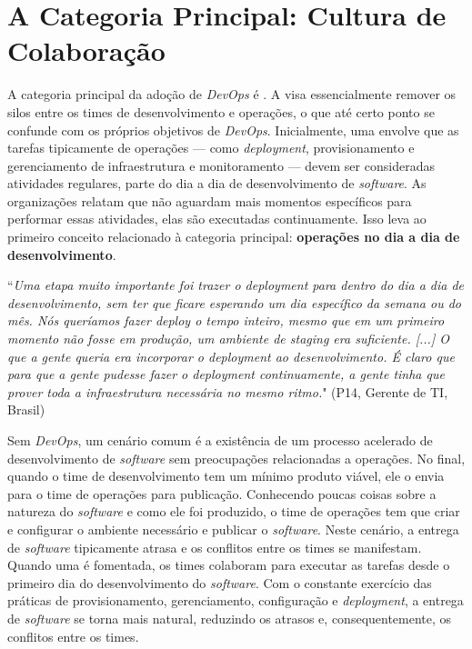 \section{A Categoria Principal: Cultura de Colaboração}\label{secao_core_category}

A categoria principal da adoção de {\it DevOps} é \cc. A \cc visa essencialmente
remover os silos entre os times de desenvolvimento e operações, o que até certo
ponto se confunde com os próprios objetivos de {\it DevOps}. Inicialmente, uma
\cc envolve que as tarefas tipicamente de operações --- como {\it deployment},
provisionamento e gerenciamento de infraestrutura e monitoramento --- devem ser
consideradas atividades regulares, parte do dia a dia de desenvolvimento de
{\it software}. As organizações relatam que não aguardam mais momentos específicos
para performar essas atividades, elas são executadas continuamente. Isso leva
ao primeiro conceito relacionado à categoria principal: {\bf operações no dia
a dia de desenvolvimento}.

\begin{mq}
``\emph{Uma etapa muito importante foi trazer o {\it deployment} para dentro do
dia a dia de desenvolvimento, sem ter que ficare esperando um dia específico
da semana ou do mês. Nós queríamos fazer {\it deploy} o tempo inteiro, mesmo
que em um primeiro momento não fosse em produção, um ambiente de {\it staging}
era suficiente. [...] O que a gente queria era incorporar o {\it deployment} ao
desenvolvimento. É claro que para que a gente pudesse fazer o {\it deployment}
continuamente, a gente tinha que prover toda a infraestrutura necessária no
mesmo ritmo.}" (P14, Gerente de \acrshort{TI}, Brasil)
\end{mq}

Sem {\it DevOps}, um cenário comum é a existência de um processo acelerado de
desenvolvimento de {\it software} sem preocupações relacionadas a operações.
No final, quando o time de desenvolvimento tem um mínimo produto viável, ele
o envia para o time de operações para publicação. Conhecendo poucas coisas sobre
a natureza do {\it software} e como ele foi produzido, o time de operações tem
que criar e configurar o ambiente necessário e publicar o {\it software}. Neste
cenário, a entrega de {\it software} tipicamente atrasa e os conflitos entre
os times se manifestam. Quando uma \cc é fomentada, os times colaboram para
executar as tarefas desde o primeiro dia do desenvolvimento do {\it software}.
Com o constante exercício das práticas de provisionamento, gerenciamento,
configuração e {\it deployment}, a entrega de {\it software} se torna mais
natural, reduzindo os atrasos e, consequentemente, os conflitos entre os times.

